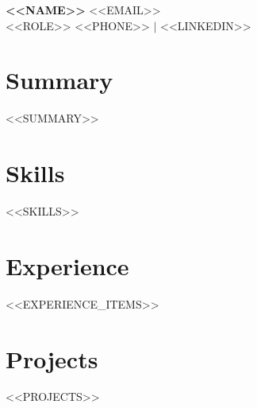 \documentclass[letterpaper,10.5pt]{article}
\begin{document}
{\Large \textbf{<<NAME>>}} \hfill \small <<EMAIL>>\\
{\small <<ROLE>>} \hfill \small <<PHONE>> $|$ <<LINKEDIN>>

\vspace{6pt}

\section{Summary}
\small <<SUMMARY>>

\section{Skills}
\small <<SKILLS>>

\section{Experience}
\begin{itemize}[leftmargin=*]
<<EXPERIENCE_ITEMS>>
\end{itemize}

\section{Projects}
<<PROJECTS>>
\end{document}
